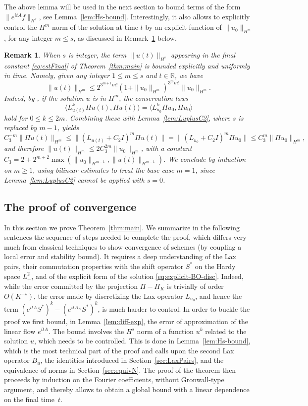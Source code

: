 \documentclass [11pt] {article}
\newtheorem{rem}[thm]{Remark}
\begin{document}
The above lemma will be used in the next section to bound terms of the form $\|e^{itA}f\|_{H^s}$, see Lemma~\ref{lem:Hs-bound}.
Interestingly, it also allows to explicitly control the $H^m$ norm of the solution at time $t$ by an explicit function of $\|u_0\|_{H^m}$, for any integer $m\leq s$, as discussed in Remark~\ref{cor:norm_of_u(t)} below.
\begin{rem}
\label{cor:norm_of_u(t)}
When $s$ is integer, the term $\|u(t)\|_{H^s}$ appearing in the final constant \eqref{eq:cstFinal} of Theorem~\ref{thm:main} is bounded {\it explicitly} and uniformly in time. Namely, given  any integer $1\leq m\leq s$ and $t\in \mathbb R$, we have
\[
\|u(t)\|_{H^m}\leq 2^{3^{m+1} m!}(1+\|u_0\|_{H^m})^{3^mm!}\|u_0\|_{H^m}.
\]
Indeed, by \cite[equation (1.15)]{KLV24}, if the solution $u$ is in $H^m$, the conservation laws
\[
\langle L_{u(t)}^k\Pi u(t),\Pi u(t)\rangle=\langle L_{u_0}^k\Pi u_0,\Pi u_0\rangle
\]
hold for $0\leq k\leq 2m$. Combining these with Lemma~\ref{lem:LuplusC2}, where $s$ is replaced by $m-1$, yields
\[
C_3^{-m}\|\Pi u(t)\|_{H^m}
\leq \|(L_{u(t)}+C_2 I)^m \Pi u(t)\|
=\|(L_{u_0}+C_2 I)^m \Pi u_0\|\leq C_3^m\|\Pi u_0\|_{H^m},
\]
and therefore $\|u(t)\|_{H^m}\leq 2C_3^{2m}\|u_0\|_{H^m}$, with a constant $C_3=2+2^{m+2}\max(\|u_0\|_{H^{m-1}},\|u(t)\|_{H^{m-1}})$.
We conclude by induction on $m\geq 1$, using bilinear estimates to treat the base case $m=1$, since Lemma~\ref{lem:LuplusC2} cannot be applied with $s=0$.
\end{rem}


\subsection{The proof of convergence}\label{subsec:pf}
In this section we prove Theorem~\ref{thm:main}. We summarize in the following sentences the sequence of steps needed to complete the proof, which differs very much from classical techniques to show convergence of schemes (by coupling a local error and stability bound). It requires a deep understanding of the Lax pairs, their commutation properties with the shift operator $S^{*}$ on the Hardy space $L^2_+$, and of the explicit form of the solution \eqref{eq:explicit-BO-disc}. Indeed, while the error committed by the projection $\Pi - \Pi_{K}$ is trivially of order $O(K^{-s})$, the error made by discretizing the Lax operator $L_{u_{0}}$, and hence the term $(e^{itA}S^{*})^k - (e^{itA_K}S^{*})^k$, is much harder to control. In order to buckle the proof we first bound, in Lemma~\ref{lem:diff-exp}, the error of approximation of the linear flow $e^{itA}$. The bound involves the $H^s$ norm of a function $u^k$ related to the solution $u$, which needs to be controlled. This is done in Lemma~\ref{lem:Hs-bound}, which is the most technical part of the proof and calls upon the second Lax operator $B_{u}$, the identities introduced in Section~\ref{sec:LaxPairs}, and the equivalence of norms in Section~\ref{sec:equivN}. 
The proof of the theorem then proceeds by induction on the Fourier coefficients, without Gronwall-type argument, and thereby allows to obtain a global bound with a linear dependence on the final time~$t$.
\end{document}

